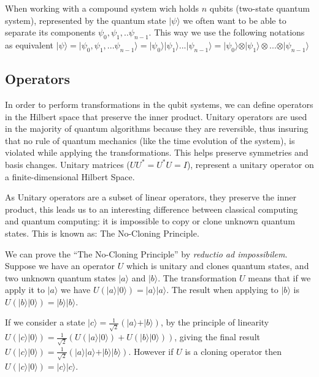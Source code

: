 When working with a compound system wich holds $n$ qubits (two-state quantum system), represented by the quantum state $\vert \psi \rangle$ we often want to be able to separate its components $\psi_{0}, \psi_{1},.. \psi_{n-1}$. This way we use the following notations as equivalent $\vert \psi \rangle = \vert \psi_{0}, \psi_{1}, ... \psi_{n-1} \rangle = \vert \psi_{0}\rangle \vert \psi_{1}\rangle ... \vert \psi_{n-1} \rangle =  \vert \psi_{0}\rangle \otimes \vert \psi_{1}\rangle \otimes ... \otimes \vert \psi_{n-1}\rangle$\cite{Rieffel2011}



\subsection{Operators}
\label{subsec:QCoperators}

In order to perform transformations in the qubit systems, we can define operators in the Hilbert space that preserve the inner product. Unitary operators are used in the majority of quantum algorithms because they are reversible, thus insuring that no rule of quantum mechanics (like the time evolution of the system), is violated while applying the transformations. This helps preserve symmetries and basis changes. Unitary matrices ($UU^{*} = U^{*}U = I $), represent a unitary operator on a finite-dimensional Hilbert Space. 

As Unitary operators are a subset of linear operators, they preserve the inner product, this leads us to an interesting difference between classical computing and quantum computing: it is impossible to copy or clone unknown quantum states\cite{Rieffel2011}. This is known as: The No-Cloning Principle.

We can prove the ``The No-Cloning Principle'' by \textit{reductio ad impossibilem}. Suppose we have an operator $U$ which is unitary and clones quantum states, and two unknown quantum states $\vert a \rangle$ and $\vert  b \rangle$. The transformation $U$ means that if we apply it to $\vert a \rangle$ we have $U(\vert a \rangle\vert 0 \rangle)=\vert a \rangle\vert a \rangle$. The result when applying to $\vert b \rangle$ is  $U(\vert b \rangle\vert 0 \rangle)=\vert b \rangle\vert b \rangle$. 

If we consider a state  $\vert c \rangle = \frac{1}{\sqrt{2}}( \vert a \rangle + \vert b \rangle)$, by the principle of linearity $U(\vert c \rangle\vert 0 \rangle)=\frac{1}{\sqrt{2}}( U(\vert a \rangle\vert 0 \rangle) +U(\vert b \rangle\vert 0 \rangle))$, giving the final result $U(\vert c \rangle\vert 0 \rangle)=\frac{1}{\sqrt{2}}( \vert a \rangle\vert a \rangle + \vert b \rangle\vert b \rangle)$. However if $U$ is a cloning operator then $U(\vert c \rangle\vert 0 \rangle)=\vert c \rangle\vert c \rangle$. 

